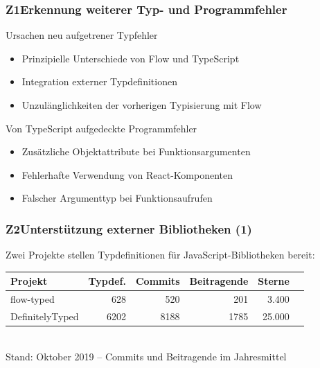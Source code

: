       \begin{frame}
        \frametitle{Z1\hspace{0.75em}Erkennung weiterer Typ- und Programmfehler}
        \begin{block}{Ursachen neu aufgetrener Typfehler}
          \begin{itemize}
            \item Prinzipielle Unterschiede von Flow und TypeScript
            \item Integration externer Typdefinitionen
            \item Unzulänglichkeiten der vorherigen Typisierung mit Flow
          \end{itemize}
        \end{block}
        \smallskip
        \begin{block}{Von TypeScript aufgedeckte Programmfehler}
          \begin{itemize}
            \item Zusätzliche Objektattribute bei Funktionsargumenten
            \item Fehlerhafte Verwendung von React-Komponenten
            \item Falscher Argumenttyp bei Funktionsaufrufen
          \end{itemize}
        \end{block}
      \end{frame}

      \begin{frame}
        \frametitle{Z2\hspace{0.75em}Unterstützung externer Bibliotheken (1)}
        Zwei Projekte stellen Typdefinitionen für JavaScript-Bibliotheken bereit:\\[1.5em]
        {
          \footnotesize
          \begin{tabu} to 
            \midrule
            \rowfont{\bfseries} Projekt & Typdef. & Commits & Beitragende & Sterne & {} \\
            \midrule
            flow-typed      &  628 &  520 &  201 &  3.400 & \autocite{FLOW_TYPED} \\
            DefinitelyTyped & 6202 & 8188 & 1785 & 25.000 & \autocite{DEFINITELY_TYPED} \\
            \midrule
          \end{tabu}
          \\[1em]
          Stand: Oktober 2019 -- Commits und Beitragende im Jahresmittel
        }
      \end{frame}

